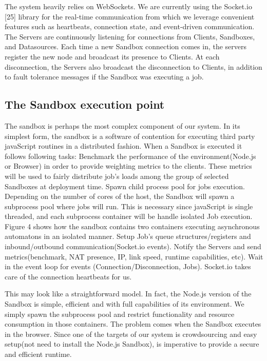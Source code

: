 \documentclass[10pt,reprint]{socc14}
\begin{document}
The system heavily relies on WebSockets. We are currently using the Socket.io [25] library for the real-time communication from which we leverage convenient features such as heartbeats, connection state, and event-driven communication. The Servers are continuously listening for connections from Clients, Sandboxes, and Datasources. Each time a new Sandbox connection comes in, the servers register the new node and broadcast its presence to Clients. At each disconnection, the Servers also broadcast the disconnection to Clients, in addition to fault tolerance messages if the Sandbox was executing a job.

\subsection{The Sandbox execution point}

The sandbox is perhaps the most complex component of our system. In its simplest form, the sandbox is a software of contention for executing third party javaScript routines in a distributed fashion. When a Sandbox is executed it follows following tasks:
Benchmark the performance of the environment(Node.js or Browser) in order to provide weighting metrics to the clients. These metrics will be used to fairly distribute job's loads among the group of selected Sandboxes at deployment time.
Spawn child process pool for jobs execution. Depending on the number of cores of the host, the Sandbox will spawn a subprocess pool where jobs will run. This is necessary since javaScript is single threaded, and each subprocess container will be handle isolated Job execution. Figure 4 shows how the sandbox contains two containers executing asynchronous automatons in an isolated manner.
Setup Job's queue structures/registers and inbound/outbound communication(Socket.io events).
Notify the Servers and send metrics(benchmark, NAT presence, IP, link speed, runtime capabilities, etc).
Wait in the event loop for events (Connection/Disconnection, Jobs). Socket.io takes care of the connection heartbeats for us.

This may look like a straightforward model. In fact, the Node.js version of the Sandbox is simple, efficient and with full capabilities of its environment. We simply spawn the subprocess pool and restrict functionality and resource consumption in those containers. The problem comes when the Sandbox executes in the browser. Since one of the targets of our system is crowdsourcing and easy setup(not need to install the Node.js Sandbox), is imperative to provide a secure and efficient runtime.
\end{document}
